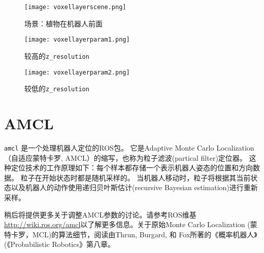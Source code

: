 \begin{figure}[!h]
\end{figure}

\begin{figure}[!h]
	\texttt{[image: voxellayerscene.png]}
	\caption{场景：植物在机器人前面}
	\endminipage\hfill
	\texttt{[image: voxellayerparam1.png]}
	\caption{较高的\texttt{z\_resolution}}
	\endminipage\hfill
	\texttt{[image: voxellayerparam2.png]}
	\caption{较低的\texttt{z\_resolution}}
	\endminipage\hfill
\end{figure}


\section[AMCL]{AMCL}


\texttt{amcl} 是一个处理机器人定位的ROS包。 它是Adaptive Monte Carlo Localization（自适应蒙特卡罗, AMCL）的缩写，也称为粒子滤波(partical filter)定位器。 这种定位技术的工作原理如下：每个样本都存储一个表示机器人姿态的位置和方向数据。 
粒子在开始状态时都是随机采样的。 
当机器人移动时，粒子将根据其当前状态以及机器人的动作使用递归贝叶斯估计(recursive Bayesian estimation)进行重新采样。


稍后将提供更多关于调整AMCL参数的讨论。请参考ROS维基\url{http://wiki.ros.org/amcl}以了解更多信息。关于原始Monte Carlo Localization (蒙特卡罗，MCL)的算法细节，阅读由Thrun, Burgard, 和 Fox所著的《概率机器人》(《Probabilistic Robotics》第八章\cite{thrun2005probabilistic}。

